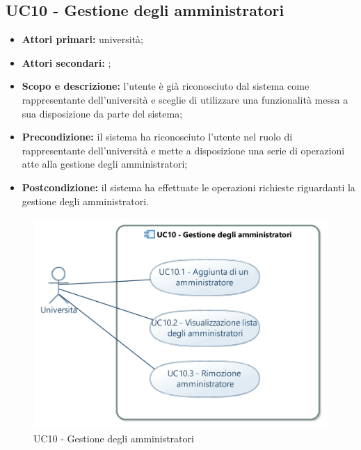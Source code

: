 \documentclass[AnalisiDeiRequisiti.tex]{subfiles}
\begin{document}
\subsection{UC10 - Gestione degli amministratori}
\begin{itemize}
	\item \textbf{Attori primari:} università;
	\item \textbf{Attori secondari:} ;
	\item \textbf{Scopo e descrizione:} l'utente è già riconosciuto dal sistema come rappresentante dell'università e sceglie di utilizzare una funzionalità messa a sua disposizione da parte del sistema;
	\item \textbf{Precondizione:} il sistema ha riconosciuto l'utente nel ruolo di rappresentante dell'università e mette a disposizione una serie di operazioni atte alla gestione degli amministratori; 
	\item \textbf{Postcondizione:} il sistema ha effettuate le operazioni richieste riguardanti la gestione degli amministratori.
\end{itemize}

\begin{figure}[H]
	\centering
	\includegraphics[width=1.0\linewidth]{UC10.jpg}
	\caption{UC10 - Gestione degli amministratori}
	\label{fig:UC10 - Gestione degli amministratori}
\end{figure}
\end{document}
